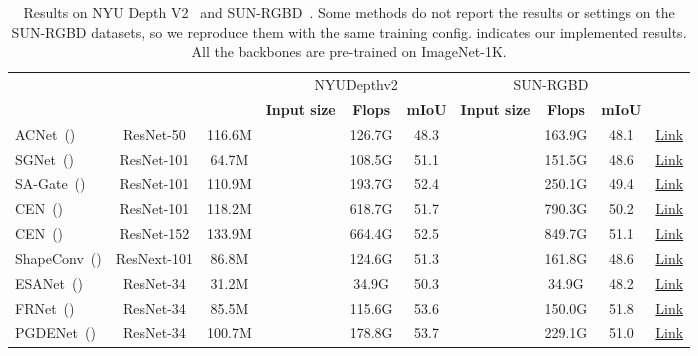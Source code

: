 \documentclass{article}
\begin{document}
\begin{table}[tp]
  \centering
\setlength{\tabcolsep}{4pt}
    \scriptsize
    \caption{\small Results on NYU Depth V2~\citep{silberman2012nyu_dataset} and SUN-RGBD~\citep{song2015sun_rgbd}.
    Some methods do not report the results or settings on the SUN-RGBD datasets, so we reproduce them with the same training config.  indicates our implemented results. All the backbones are pre-trained on ImageNet-1K.}
    \vspace{-10pt}
    \centering
    \renewcommand{\arraystretch}{0.9}
    	\begin{tabular}{lccccccccc}
        \toprule
        \textbf{\multirow{2}{*}{Model}}  &\textbf{\multirow{2}{*}{Backbone}}   & \textbf{\multirow{2}{*}{Params}} &\multicolumn{3}{c}{NYUDepthv2} & \multicolumn{3}{c}{SUN-RGBD} &\textbf{\multirow{2}{*}{Code}}\\ \cmidrule(lr){4-6}\cmidrule(lr){7-9}
         && &\textbf{Input size}& \textbf{Flops}& \textbf{mIoU}   &\textbf{Input size}& \textbf{Flops}& \textbf{mIoU} & \\
        \midrule\midrule
ACNet~(\citeauthor{hu2019acnet})&ResNet-50&116.6M& &126.7G& 48.3 &&163.9G&48.1&\href{https://github.com/anheidelonghu/ACNet}{Link} \\
SGNet~(\citeauthor{chen2021spatial_guided})&ResNet-101&64.7M& &108.5G& 51.1 &&151.5G&48.6&\href{https://github.com/LinZhuoChen/SGNet}{Link}\\
SA-Gate~(\citeauthor{chen2020sa_gate})&ResNet-101&110.9M& &193.7G& 52.4 &&250.1G&49.4&\href{https://github.com/charlesCXK/RGBD_Semantic_Segmentation_PyTorch}{Link} \\
CEN~(\citeauthor{wang2020deep})&ResNet-101&118.2M&&618.7G&51.7&&790.3G&50.2&\href{https://github.com/yikaiw/CEN}{Link}\\
        CEN~(\citeauthor{wang2020deep})&ResNet-152&133.9M&&664.4G&52.5&&849.7G&51.1&\href{https://github.com/yikaiw/CEN}{Link}\\
        ShapeConv~(\citeauthor{cao2021shapeconv})&ResNext-101&86.8M& &124.6G& 51.3 &&161.8G&48.6&\href{https://github.com/hanchaoleng/ShapeConv}{Link} \\ ESANet~(\citeauthor{seichter2021efficient})&ResNet-34&31.2M&&34.9G&50.3&&34.9G&48.2&\href{https://github.com/TUI-NICR/ESANet}{Link}\\
        FRNet~(\citeauthor{zhou2022frnet})&ResNet-34&85.5M&&115.6G&53.6&&150.0G&51.8&\href{https://github.com/EnquanYang2022/FRNet}{Link}\\
        PGDENet~(\citeauthor{zhou2022pgdenet})&ResNet-34&100.7M&&178.8G&53.7&&229.1G&51.0&\href{https://github.com/EnquanYang2022/PGDENet}{Link}\\

\end{tabular}
\end{table}
\end{document}
